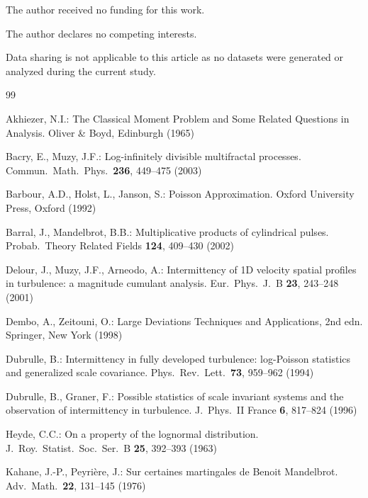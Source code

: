 \documentclass[pdflatex,sn-mathphys-num]{sn-jnl}
\theoremstyle{thmstyleone}
\theoremstyle{thmstyletwo}
\theoremstyle{thmstylethree}
\begin{document}
\backmatter

The author received no funding for this work.

The author declares no competing interests.

Data sharing is not applicable to this article as no datasets were
generated or analyzed during the current study.

\begin{thebibliography}{99}

Akhiezer, N.I.:
The Classical Moment Problem and Some Related Questions in
Analysis.
Oliver \& Boyd, Edinburgh (1965)

Bacry, E., Muzy, J.F.:
Log-infinitely divisible multifractal processes.
Commun.\ Math.\ Phys.\ \textbf{236}, 449--475 (2003)

Barbour, A.D., Holst, L., Janson, S.:
Poisson Approximation.
Oxford University Press, Oxford (1992)

Barral, J., Mandelbrot, B.B.:
Multiplicative products of cylindrical pulses.
Probab.\ Theory Related Fields \textbf{124}, 409--430 (2002)

Delour, J., Muzy, J.F., Arneodo, A.:
Intermittency of 1D velocity spatial profiles in turbulence: a
magnitude cumulant analysis.
Eur.\ Phys.\ J.\ B \textbf{23}, 243--248 (2001)

Dembo, A., Zeitouni, O.:
Large Deviations Techniques and Applications, 2nd edn.
Springer, New York (1998)

Dubrulle, B.:
Intermittency in fully developed turbulence: log-Poisson statistics
and generalized scale covariance.
Phys.\ Rev.\ Lett.\ \textbf{73}, 959--962 (1994)

Dubrulle, B., Graner, F.:
Possible statistics of scale invariant systems and the observation of
intermittency in turbulence.
J.\ Phys.\ II France \textbf{6}, 817--824 (1996)

Heyde, C.C.:
On a property of the lognormal distribution.
J.\ Roy.\ Statist.\ Soc.\ Ser.\ B \textbf{25}, 392--393 (1963)

Kahane, J.-P., Peyri\`ere, J.:
Sur certaines martingales de Benoit Mandelbrot.
Adv.\ Math.\ \textbf{22}, 131--145 (1976)


\end{thebibliography}
\end{document}
